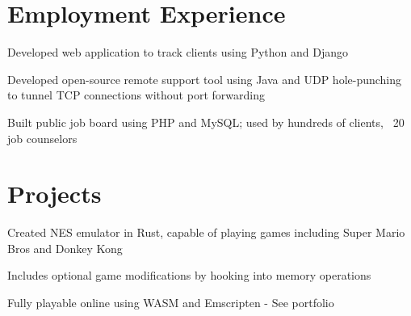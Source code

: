 \documentclass[]{deedy-resume-openfont}
\begin{document}
\hfill
\begin{minipage}[t]{0.67\textwidth} 


\section{Employment Experience}
\vspace{\topsep} %
\begin{tightemize}
	\item 
\end{tightemize}
\sectionsep

\begin{tightemize}
\item Developed web application to track clients using Python and Django
\end{tightemize}
\sectionsep

\begin{tightemize}
\item Developed open-source remote support tool using Java and UDP hole-punching to tunnel TCP connections without port forwarding
\item Built public job board using PHP and MySQL; used by hundreds of clients, ~20 job counselors
\end{tightemize}
\sectionsep

\section{Projects}

\begin{tightemize}
	\item Created NES emulator in Rust, capable of playing games including Super Mario Bros and Donkey Kong
	\item Includes optional game modifications by hooking into memory operations
	\item Fully playable online using WASM and Emscripten - See portfolio
\end{tightemize}
\sectionsep


\end{minipage}
\end{document}
